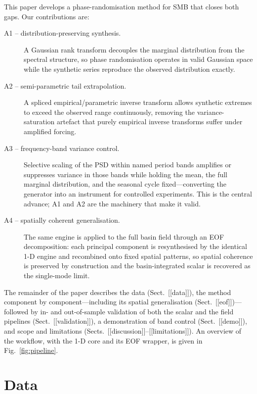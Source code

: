 This paper develops a phase-randomisation method for SMB that closes both
gaps. Our contributions are:
\begin{description}
  \item[A1 -- distribution-preserving synthesis.] A Gaussian rank transform
  decouples the marginal distribution from the spectral structure, so phase
  randomisation operates in valid Gaussian space while the synthetic series
  reproduce the observed distribution exactly.
  \item[A2 -- semi-parametric tail extrapolation.] A spliced
  empirical/parametric inverse transform allows synthetic extremes to
  exceed the observed range continuously, removing the variance-saturation
  artefact that purely empirical inverse transforms suffer under amplified
  forcing.
  \item[A3 -- frequency-band variance control.] Selective scaling of the
  PSD within named period bands amplifies or suppresses variance in those
  bands while holding the mean, the full marginal distribution, and the
  seasonal cycle fixed---converting the generator into an instrument for
  controlled experiments. This is the central advance; A1 and A2 are the
  machinery that make it valid.
  \item[A4 -- spatially coherent generalisation.] The same engine is applied
  to the full basin field through an EOF decomposition: each principal
  component is resynthesised by the identical 1-D engine and recombined onto
  fixed spatial patterns, so spatial coherence is preserved by construction
  and the basin-integrated scalar is recovered as the single-mode limit.
\end{description}
The remainder of the paper describes the data (Sect.~[[data]]), the method
component by component---including its spatial generalisation
(Sect.~[[eof]])---followed by in- and out-of-sample validation of both the
scalar and the field pipelines (Sect.~[[validation]]), a demonstration of
band control (Sect.~[[demo]]), and scope and limitations
(Sects.~[[discussion]]--[[limitations]]). An overview of the workflow, with
the 1-D core and its EOF wrapper, is given in Fig.~\ref{fig:pipeline}.


\section{Data}\label{sec:data}

